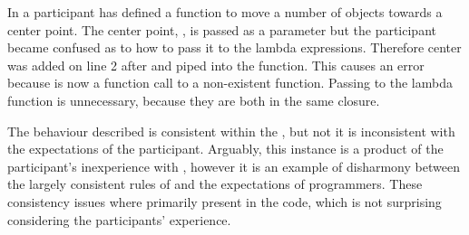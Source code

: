 In  a participant has defined a function to move a number of objects towards a center point. The center point, , is passed as a parameter but the participant became confused as to how to pass it to the lambda expressions. Therefore center was added on line 2 after  and piped into the  function. This causes an error because  is now a function call to a non-existent function. Passing  to the lambda function is unnecessary, because they are both in the same closure.

The behaviour described is consistent within the \fs, but not it is inconsistent with the expectations of the participant. Arguably, this instance is a product of the participant's inexperience with \fs, however it is an example of disharmony between the largely consistent rules of \fs and the expectations of programmers. These consistency issues where primarily present in the \fs code, which is not surprising considering the participants' experience.
